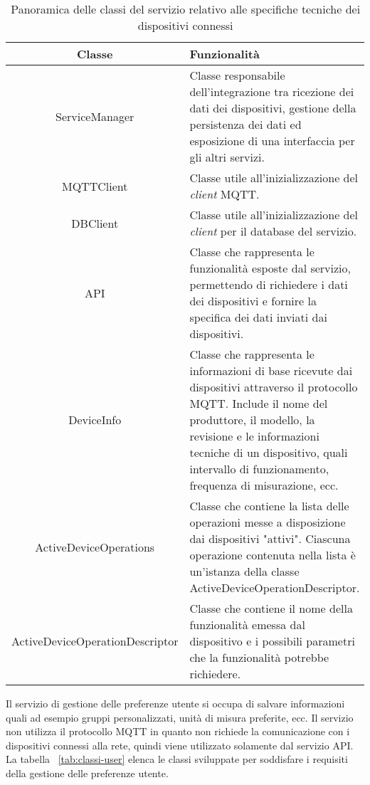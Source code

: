 \begin{table}[H]
\caption{Panoramica delle classi del servizio relativo alle specifiche tecniche dei dispositivi connessi}
\label{tab:classi-info}
\begin{tabularx}{\linewidth}{|c|X|}
\hline
\textbf{Classe} & \textbf{Funzionalità} \\
\hline
ServiceManager & Classe responsabile dell'integrazione tra ricezione dei dati dei dispositivi, gestione della persistenza dei dati ed esposizione di una interfaccia per gli altri servizi. \\
\hline
MQTTClient & Classe utile all'inizializzazione del \emph{client} MQTT. \\
\hline
DBClient & Classe utile all'inizializzazione del \emph{client} per il database del servizio. \\
\hline
API & Classe che rappresenta le funzionalità esposte dal servizio, permettendo di richiedere i dati dei dispositivi e fornire la specifica dei dati inviati dai dispositivi. \\
\hline
DeviceInfo & Classe che rappresenta le informazioni di base ricevute dai dispositivi attraverso il protocollo MQTT. Include il nome del produttore, il modello, la revisione e le informazioni tecniche di un dispositivo, quali intervallo di funzionamento, frequenza di misurazione, ecc. \\
\hline
ActiveDeviceOperations & Classe che contiene la lista delle operazioni messe a disposizione dai dispositivi "attivi". Ciascuna operazione contenuta nella lista è un'istanza della classe ActiveDeviceOperationDescriptor. \\
\hline
ActiveDeviceOperationDescriptor & Classe che contiene il nome della funzionalità emessa dal dispositivo e i possibili parametri che la funzionalità potrebbe richiedere. \\
\hline
\end{tabularx}
\end{table}


Il servizio di gestione delle preferenze utente si occupa di salvare informazioni quali ad esempio gruppi personalizzati, unità di misura preferite, ecc.
Il servizio non utilizza il protocollo MQTT in quanto non richiede la comunicazione con i dispositivi connessi alla rete, quindi viene utilizzato solamente dal servizio API.
La tabella ~\ref{tab:classi-user} elenca le classi sviluppate per soddisfare i requisiti della gestione delle preferenze utente.

